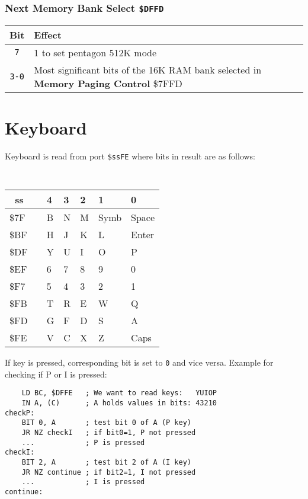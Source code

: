 \documentclass[12pt,twoside,openright,a4paper]{book}
\newcommand{\instrt}{\rule{0pt}{2.5ex}}
\newcommand{\instrb}{\rule[-1.4ex]{0pt}{0pt}}
\newcommand{\notet}{\rule{0pt}{2.4ex}}
\begin{document}
\subsubsection{Next Memory Bank Select {\tt \$DFFD}}

\begin{tabular}{cp{12cm}}
	Bit & Effect \\
	\hline
	{\tt 7}\notet & 
		1 to set pentagon 512K mode \\
	{\tt 3-0}\notet &
		Most significant bits of the 16K RAM bank selected in \textbf{Memory Paging Control} \$7FFD  \\
\end{tabular}


\pagebreak
\section{Keyboard}
\label{zx_next_keyboard}

Keyboard is read from port {\tt \$ssFE} where bits in result are as follows:

{
	\tt
	\setlength{\extrarowheight}{0pt}
	\def\arraystretch{0.1}
	
	\begin{tabular}{p{0.7cm}|cp{1cm}p{1cm}p{1cm}p{1.3cm}p{1.5cm}}

		~ss & & 4 & 3 & 2 & 1 & 0 \instrb \\
		\hline
		\$7F\instrt & & B & N & M & Symb & Space \\
		\$BF\instrt & & H & J & K & L & Enter \\
		\$DF\instrt & & Y & U & I & O & P \\
		\$EF\instrt & & 6 & 7 & 8 & 9 & 0 \\
		\$F7\instrt & & 5 & 4 & 3 & 2 & 1 \\
		\$FB\instrt & & T & R & E & W & Q \\
		\$FD\instrt & & G & F & D & S & A \\
		\$FE\instrt\instrb & & V & C & X & Z & Caps \\

	\end{tabular}
}

If key is pressed, corresponding bit is set to {\tt 0} and vice versa. Example for checking if P or I is pressed:
	
\begin{Verbatim}
	LD BC, $DFFE   ; We want to read keys:   YUIOP
	IN A, (C)      ; A holds values in bits: 43210
checkP:
	BIT 0, A       ; test bit 0 of A (P key)
	JR NZ checkI   ; if bit0=1, P not pressed
	...            ; P is pressed
checkI:
	BIT 2, A       ; test bit 2 of A (I key)
	JR NZ continue ; if bit2=1, I not pressed
	...            ; I is pressed
continue:
\end{Verbatim}
\end{document}
